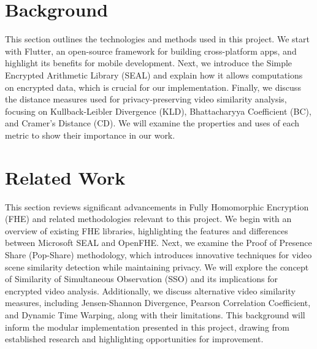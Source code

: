 \documentclass [11pt, proquest] {uwthesis}[2020/02/24]
\begin{document}




 
\chapter{Background}

This section outlines the technologies and methods used in this project. We start with Flutter, an open-source framework for building cross-platform apps, and highlight its benefits for mobile development. Next, we introduce the Simple Encrypted Arithmetic Library (SEAL) and explain how it allows computations on encrypted data, which is crucial for our implementation. Finally, we discuss the distance measures used for privacy-preserving video similarity analysis, focusing on Kullback-Leibler Divergence (KLD), Bhattacharyya Coefficient (BC), and Cramer’s Distance (CD). We will examine the properties and uses of each metric to show their importance in our work.





 
\chapter{Related Work}

This section reviews significant advancements in Fully Homomorphic Encryption (FHE) and related methodologies relevant to this project. We begin with an overview of existing FHE libraries, highlighting the features and differences between Microsoft SEAL and OpenFHE. Next, we examine the Proof of Presence Share (Pop-Share) methodology, which introduces innovative techniques for video scene similarity detection while maintaining privacy. We will explore the concept of Similarity of Simultaneous Observation (SSO) and its implications for encrypted video analysis. Additionally, we discuss alternative video similarity measures, including Jensen-Shannon Divergence, Pearson Correlation Coefficient, and Dynamic Time Warping, along with their limitations. This background will inform the modular implementation presented in this project, drawing from established research and highlighting opportunities for improvement.




\end{document}

